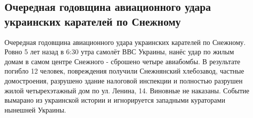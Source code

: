  
 
\subsection{Очередная годовщина авиационного удара украинских карателей по Снежному}
\label{sec:15_07_2020.fb.gleb_bobrov}
  
Очередная годовщина авиационного удара украинских карателей по Снежному. Ровно
5 лет назад в 6:30 утра самолёт ВВС Украины, нанёс удар по жилым домам в самом
центре Снежного - сброшено четыре авиабомбы. В результате погибло 12 человек,
повреждения получили Снежнянский хлебозавод, частные домостроения, разрушено
здание налоговой инспекции и полностью разрушен жилой четырехэтажный дом по ул.
Ленина, 14. Виновные не наказаны. Событие вымарано из украинской истории и
игнорируется западными кураторами нынешней Украины.
  
